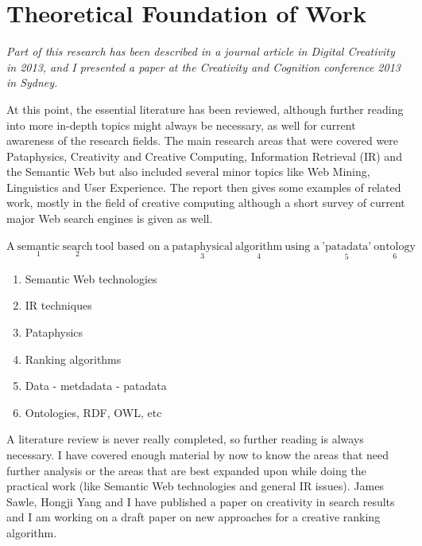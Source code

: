 
\chapter{Theoretical Foundation of Work}
\label{ch:theoretical}

\emph{Part of this research has been described in a journal article in Digital Creativity in 2013, and I presented a paper at the Creativity and Cognition conference 2013 in Sydney.}

\grule

At this point, the essential literature has been reviewed, although further reading into more in-depth topics might always be necessary, as well for current awareness of the research fields. The main research areas that were covered were Pataphysics, Creativity and Creative Computing, Information Retrieval (IR) and the Semantic Web but also included several minor topics like Web Mining, Linguistics and User Experience. The report then gives some examples of related work, mostly in the field of creative computing although a short survey of current major Web search engines is given as well.

$\text{A} \ \underset{1}{\text{semantic}} \ \underset{2}{\text{search}} \ \text{tool based on a} \ \underset{3}{\text{pataphysical}} \ \underset{4}{\text{algorithm}} \ \text{using a} \ \underset{5}{\text{'patadata'}} \ \underset{6}{\text{ontology}}$

\begin{enumerate}
  \item Semantic Web technologies
  \item IR techniques
  \item Pataphysics
  \item Ranking algorithms
  \item Data - metdadata - patadata
  \item Ontologies, RDF, OWL, etc
\end{enumerate}

A literature review is never really completed, so further reading is always necessary. I have covered enough material by now to know the areas that need further analysis or the areas that are best expanded upon while doing the practical work (like Semantic Web technologies and general IR issues). James Sawle, Hongji Yang and I have published a paper on creativity in search results and I am working on a draft paper on new approaches for a creative ranking algorithm.

